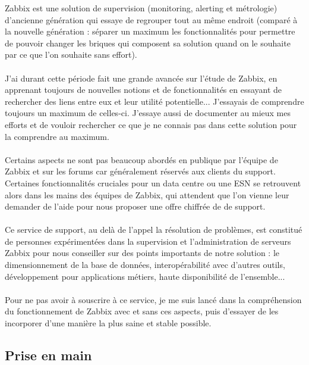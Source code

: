 Zabbix est une solution de supervision (monitoring, alerting et métrologie) d'ancienne génération qui essaye de regrouper tout au même endroit (comparé à la nouvelle génération : séparer un maximum les fonctionnalités pour permettre de pouvoir changer les briques qui composent sa solution quand on le souhaite par ce que l'on souhaite sans effort).
\\ \\
J'ai durant cette période fait une grande avancée sur l'étude de Zabbix, en apprenant toujours de nouvelles notions et de fonctionnalités en essayant de rechercher des liens entre eux et leur utilité potentielle... J'essayais de comprendre toujours un maximum de celles-ci. J'essaye aussi de documenter au mieux mes efforts et de vouloir rechercher ce que je ne connais pas dans cette solution pour la comprendre au maximum.
\\ \\
Certains aspects ne sont pas beaucoup abordés en publique par l'équipe de Zabbix et sur les forums car généralement réservés aux clients du support. Certaines fonctionnalités cruciales pour un data centre ou une ESN se retrouvent alors dans les mains des équipes de Zabbix, qui attendent que l'on vienne leur demander de l'aide pour nous proposer une offre chiffrée de de support.
\\ \\
Ce service de support, au delà de l'appel la résolution de problèmes, est constitué de personnes expérimentées dans la supervision et l'administration de serveurs Zabbix pour nous conseiller sur des points importants de notre solution : le dimensionnement de la base de données, interopérabilité avec d'autres outils, développement pour applications métiers, haute disponibilité de l'ensemble...
\\ \\
Pour ne pas avoir à souscrire à ce service, je me suis lancé dans la compréhension du fonctionnement de Zabbix avec et sans ces aspects, puis d'essayer de les incorporer d'une manière la plus saine et stable possible.

\subsection{Prise en main}

